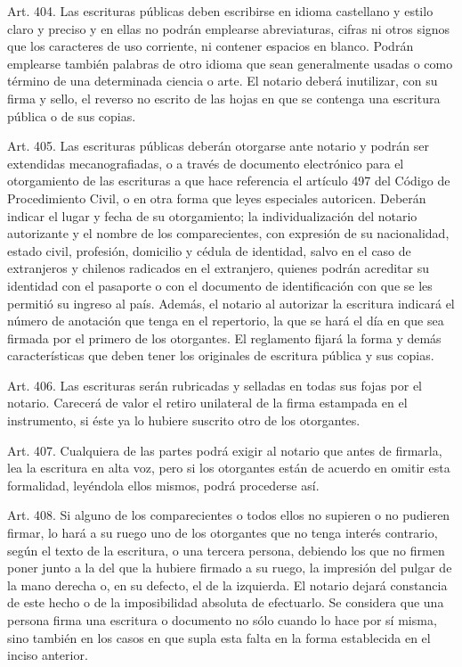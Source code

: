     Art. 404. Las escrituras públicas deben escribirse en idioma castellano y estilo claro y preciso y en ellas no podrán emplearse abreviaturas, cifras ni otros signos que los caracteres de uso corriente, ni contener espacios en blanco.
    Podrán emplearse también palabras de otro idioma que sean generalmente usadas o como término de una determinada ciencia o arte.
    El notario deberá inutilizar, con su firma y sello, el reverso no escrito de las hojas en que se contenga una escritura pública o de sus copias.



    Art. 405. Las escrituras públicas deberán otorgarse ante notario y podrán ser extendidas mecanografiadas, o a través de documento electrónico para el otorgamiento de las escrituras a que hace referencia el artículo 497 del Código de Procedimiento Civil, o en otra forma que leyes especiales autoricen. Deberán indicar el lugar y fecha de su otorgamiento; la individualización del notario autorizante y el nombre de los comparecientes, con expresión de su nacionalidad, estado civil, profesión, domicilio y cédula de identidad, salvo en el caso de extranjeros y chilenos radicados en el extranjero, quienes podrán acreditar su identidad con el pasaporte o con el documento de identificación con que se les permitió su ingreso al país.
    Además, el notario al autorizar la escritura indicará el número de anotación que tenga en el repertorio, la que se hará el día en que sea firmada por el primero de los otorgantes.
    El reglamento fijará la forma y demás características que deben tener los originales de escritura pública y sus copias.


    Art. 406. Las escrituras serán rubricadas y selladas en todas sus fojas por el notario.
    Carecerá de valor el retiro unilateral de la firma estampada en el instrumento, si éste ya lo hubiere suscrito otro de los otorgantes.


    Art. 407. Cualquiera de las partes podrá exigir al notario que antes de firmarla, lea la escritura en alta voz, pero si los otorgantes están de acuerdo en omitir esta formalidad, leyéndola ellos mismos, podrá procederse así.



    Art. 408. Si alguno de los comparecientes o todos ellos no supieren o no pudieren firmar, lo hará a su ruego uno de los otorgantes que no tenga interés contrario, según el texto de la escritura, o una tercera persona, debiendo los que no firmen poner junto a la del que la hubiere firmado a su ruego, la impresión del pulgar de la mano derecha o, en su defecto, el de la izquierda. El notario dejará constancia de este hecho o de la imposibilidad absoluta de efectuarlo.
    Se considera que una persona firma una escritura o documento no sólo cuando lo hace por sí misma, sino también en los casos en que supla esta falta en la forma establecida en el inciso anterior.


